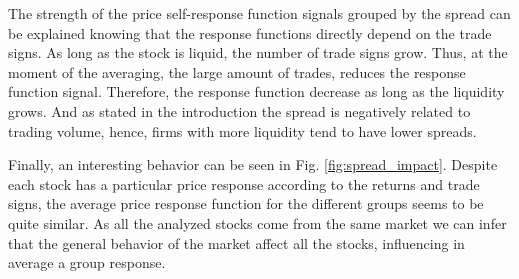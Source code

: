The strength of the price self-response function signals grouped by the spread
can be explained knowing that the response functions directly depend on the
trade signs. As long as the stock is liquid, the number of trade signs grow.
Thus, at the moment of the averaging, the large amount of trades, reduces the
response function signal. Therefore, the response function decrease as long as
the liquidity grows. And as stated in the introduction the spread is negatively
related to trading volume, hence, firms with more liquidity tend to have lower
spreads.

Finally, an interesting behavior can be seen in Fig. \ref{fig:spread_impact}.
Despite each stock has a particular price response according to the returns and
trade signs, the average price response function for the different groups
seems to be quite similar. As all the analyzed stocks come from the same market
we can infer that the general behavior of the market affect all the stocks,
influencing in average a group response.